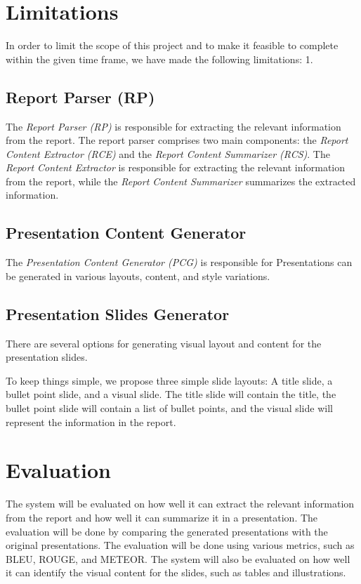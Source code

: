 \section{Limitations}
In order to limit the scope of this project and to make it feasible to complete within the given time frame, we have made the following limitations:
1. 

\subsection{Report Parser (RP)}
The \emph{Report Parser (RP)} is responsible for extracting the relevant information from the report. The report parser comprises two main components: the \emph{Report Content Extractor (RCE)} and the \emph{Report Content Summarizer (RCS)}. The \emph{Report Content Extractor} is responsible for extracting the relevant information from the report, while the \emph{Report Content Summarizer} summarizes the extracted information.

\subsection{Presentation Content Generator}
The \emph{Presentation Content Generator (PCG)} is responsible for 
Presentations can be generated in various layouts, content, and style variations. 

\subsection{Presentation Slides Generator}
There are several options for generating visual layout and content for the presentation slides. 

To keep things simple, we propose three simple slide layouts: A title slide, a bullet point slide, and a visual slide. The title slide will contain the title, the bullet point slide will contain a list of bullet points, and the visual slide will represent the information in the report.

\section{Evaluation}
The system will be evaluated on how well it can extract the relevant information from the report and how well it can summarize it in a presentation. The evaluation will be done by comparing the generated presentations with the original presentations. The evaluation will be done using various metrics, such as BLEU, ROUGE, and METEOR. The system will also be evaluated on how well it can identify the visual content for the slides, such as tables and illustrations.

